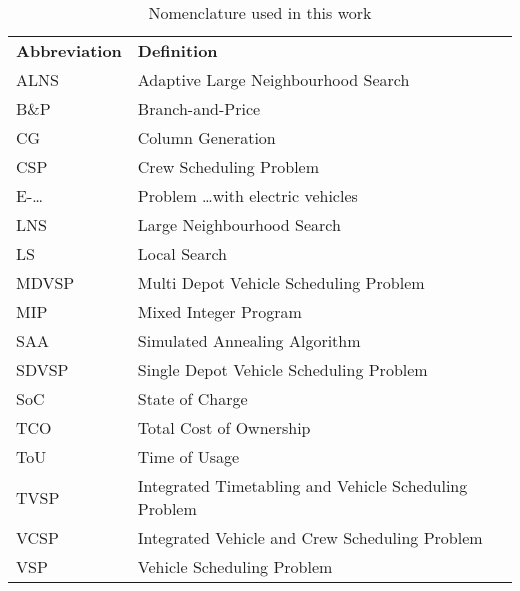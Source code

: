 \documentclass[ht]{article}
\begin{document}
\begin{table}[h]
  \centering
  \begin{tabular}{ll}
    \toprule
    \multicolumn{1}{l}{\textbf{Abbreviation}} & \multicolumn{1}{l}{\textbf{Definition}}               \\
    \cmidrule(lr){1-1}\cmidrule(lr){2-2}
    ALNS                                      & Adaptive Large Neighbourhood Search                   \\
    B\&P                                      & Branch-and-Price                                      \\
    CG                                        & Column Generation                                     \\
    CSP                                       & Crew Scheduling Problem                               \\
    E-\dots                                   & Problem \dots with electric vehicles                  \\
    LNS                                       & Large Neighbourhood Search                            \\
    LS                                        & Local Search                                          \\
    MDVSP                                     & Multi Depot Vehicle Scheduling Problem                \\
    MIP                                       & Mixed Integer Program                                 \\
    SAA                                       & Simulated Annealing Algorithm                         \\
    SDVSP                                     & Single Depot Vehicle Scheduling Problem               \\
    SoC                                       & State of Charge                                       \\
    TCO                                       & Total Cost of Ownership                               \\
    ToU                                       & Time of Usage                                         \\
    TVSP                                      & Integrated Timetabling and Vehicle Scheduling Problem \\
    VCSP                                      & Integrated Vehicle and Crew Scheduling Problem        \\
    VSP                                       & Vehicle Scheduling Problem                            \\
    \bottomrule
  \end{tabular}
  \caption{Nomenclature used in this work}
\end{table}
\end{document}

